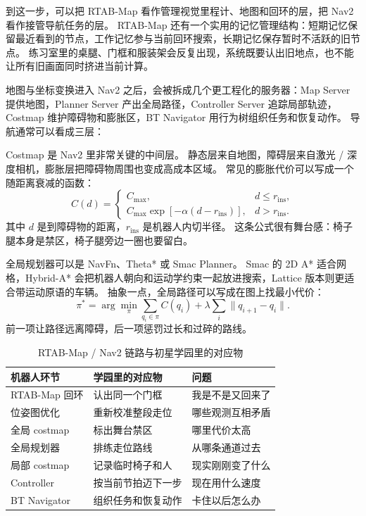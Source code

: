到这一步，可以把 RTAB-Map 看作管理视觉里程计、地图和回环的层，把 Nav2 看作接管导航任务的层\cite{labbe2013rtabmap,nav2docs}。
RTAB-Map 还有一个实用的记忆管理结构：短期记忆保留最近看到的节点，工作记忆参与当前回环搜索，长期记忆保存暂时不活跃的旧节点\cite{labbe2013rtabmap}。
练习室里的桌腿、门框和服装架会反复出现，系统既要认出旧地点，也不能让所有旧画面同时挤进当前计算。

地图与坐标变换进入 Nav2 之后，会被拆成几个更工程化的服务器：Map Server 提供地图，Planner Server 产出全局路径，Controller Server 追踪局部轨迹，Costmap 维护障碍物和膨胀区，BT Navigator 用行为树组织任务和恢复动作\cite{nav2docs}。
导航通常可以看成三层：


Costmap 是 Nav2 里非常关键的中间层。
静态层来自地图，障碍层来自激光 / 深度相机，膨胀层把障碍物周围也变成高成本区域。
常见的膨胀代价可以写成一个随距离衰减的函数：
\begin{equation}
C(d)=
\left\{
\begin{array}{ll}
C_{\max}, & d \le r_{\mathrm{ins}},\\
C_{\max}\exp[-\alpha(d-r_{\mathrm{ins}})], & d>r_{\mathrm{ins}}.
\end{array}
\right.
\end{equation}
其中 $d$ 是到障碍物的距离，$r_{\mathrm{ins}}$ 是机器人内切半径。
这条公式很有舞台感：椅子腿本身是禁区，椅子腿旁边一圈也要留白。

全局规划器可以是 NavFn、Theta* 或 Smac Planner。
Smac 的 2D A* 适合网格，Hybrid-A* 会把机器人朝向和运动学约束一起放进搜索，Lattice 版本则更适合带运动原语的车辆\cite{nav2smac}。
抽象一点，全局路径可以写成在图上找最小代价：
\begin{equation}
\pi^\ast = \arg\min_{\pi}
\sum_{q_i\in\pi} C(q_i)
+ \lambda\sum_i \|q_{i+1}-q_i\|.
\end{equation}
前一项让路径远离障碍，后一项惩罚过长和过碎的路线。

\begin{table}[htbp]
\centering
\caption{RTAB-Map / Nav2 链路与初星学园里的对应物}
\label{tab:navi-map}
\small
\begin{tabular}{L{2.0cm} L{2.6cm} L{2.7cm}}
\toprule
机器人环节 & 学园里的对应物 & 问题 \\
\midrule
RTAB-Map 回环 & 认出同一个门框 & 我是不是又回来了 \\
位姿图优化 & 重新校准整段走位 & 哪些观测互相矛盾 \\
全局 costmap & 标出舞台禁区 & 哪里代价太高 \\
全局规划器 & 排练走位路线 & 从哪条通道过去 \\
局部 costmap & 记录临时椅子和人 & 现实刚刚变了什么 \\
Controller & 按当前节拍迈下一步 & 现在用什么速度 \\
BT Navigator & 组织任务和恢复动作 & 卡住以后怎么办 \\
\bottomrule
\end{tabular}
\end{table}

